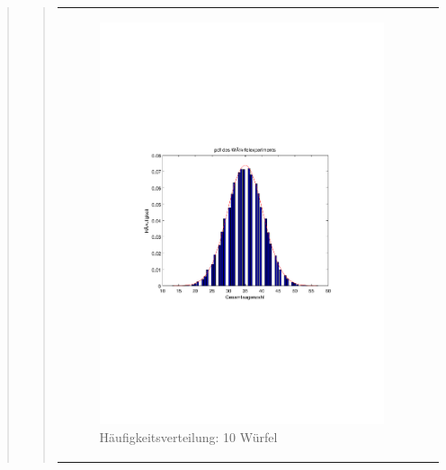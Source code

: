 \begin{quote}
\begin{quote}
\begin{center}
\begin{tabular}{ll}
        \hspace{-5cm}
            \begin{minipage}{0.6\textwidth}
                
                \begin{figure}[H]
                    \label{fig:funktion0alpha}
                    \includegraphics[scale=0.7, trim = 20mm 80mm 20mm 90mm, clip]{Bilder/A1_3_10}
                    \caption{Häufigkeitsverteilung: 10 Würfel}
                \end{figure}
        
            \end{minipage}
        

\end{tabular}
\end{center}
\end{quote}
\end{quote}
